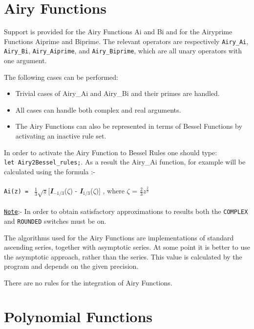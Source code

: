 \documentclass[11pt]{article}
\begin{document}
\section{Airy Functions}

Support is provided for the Airy Functions Ai and Bi and for the
Airyprime Functions Aiprime and Biprime. The relevant operators are
respectively {\tt Airy\_Ai}, {\tt Airy\_Bi}, {\tt Airy\_Aiprime}, and
{\tt Airy\_Biprime}, which are all unary operators with one argument.

The following cases can be performed:

\begin{itemize}
\item Trivial cases of Airy\_Ai and Airy\_Bi and their primes are handled.
\item All cases can handle both complex and real arguments.
\item The Airy Functions can also be represented in terms of Bessel
Functions by activating an inactive rule set.
\end{itemize}

In order to activate the Airy Function to Bessel Rules one should type: \\
{\tt let Airy2Bessel\_rules;}. As a result the Airy\_Ai function,
for example will be calculated using the formula :- \\
\\
{\tt Ai(z) = } $\frac{1}{3}$\( \sqrt{z} \)[{\bf {\sl I}}$_{-1/3}$($\zeta$)
- {\bf {\sl I}}$_{1/3}$({$\zeta$})] , where
 $\zeta$ =  $\frac{2}{3} z^{\frac{2}{3}}$\\
\\
\underline{{\tt Note}}:- In order to obtain satisfactory approximations
to results both the {\tt COMPLEX} and {\tt ROUNDED} switches must be on.

The algorithms used for the Airy Functions are implementations of
standard ascending series, together with asymptotic series. At some
point it is better to use the asymptotic approach, rather than the
series. This value is calculated by the program and depends on the given
precision.

There are no rules for the integration of Airy Functions.

\section{Polynomial Functions}
\end{document}
